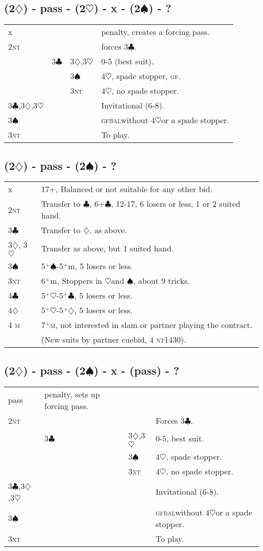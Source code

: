 \documentclass{article}
\newcommand{\bal}{\textsc{bal}}
\newcommand{\gf}{\textsc{gf}}
\renewcommand{\c}{\ensuremath{\clubsuit}}
\renewcommand{\d}{\ensuremath{\diamondsuit}}
\newcommand{\h}{\ensuremath{\heartsuit}}
\newcommand{\s}{\ensuremath{\spadesuit}}
\newcommand{\nt}{\textsc{nt}}
\newcommand{\+}{\ensuremath{^+}}
\newcommand{\M}{\textsc{m}}
\begin{document}
\subsection{(2\d) - pass - (2\h) - x - (2\s) - ?}
\begin{tabular}{llll}
x &&& penalty, creates a forcing pass.\\
2\nt &&& forces 3\c.\\
& 3\c & 3\d,3\h & 0-5 (best suit).\\
&& 3\s & 4\h, spade stopper, \gf.\\
&& 3\nt & 4\h, no spade stopper.\\
3\c,3\d,3\h &&& Invitational (6-8).\\
3\s &&& \gf \bal without 4\h or a spade stopper.\\
3\nt &&& To play.\\
\end{tabular}

\subsection{(2\d) - pass - (2\s) - ?}
\begin{tabular}{ll}
x  & 17+, Balanced or not suitable for any other bid. \\
2\nt& Transfer to \c, 6+\c, 12-17, 6 losers or less, 1 or 2 suited hand. \\
3\c & Transfer to \d, as above.\\
3\d, 3\h & Transfer as above, but 1 suited hand.\\
3\s & 5\+\s-5\+m, 5 losers or less.\\
3\nt& 6\+m, Stoppers in \h and \s, about 9 tricks.\\
4\c & 5\+\h-5\+\c, 5 losers or less.\\
4\d & 5\+\h-5\+\d, 5 losers or less.\\
4 \M& 7\+\M, not interested in slam or partner playing the contract. \\
&(New suits by partner cuebid, 4 \nt 1430).\\
\end{tabular}

\subsection{(2\d) - pass - (2\s) - x - (pass) - ?}
\begin{tabular}{llll}
pass & penalty, sets up forcing pass.\\
2\nt &&& Forces 3\c. \\
& 3\c & 3\d,3\h & 0-5, best suit. \\
&& 3\s & 4\h, spade stopper. \\
&& 3\nt & 4\h, no spade stopper.\\
3\c,3\d,3\h &&& Invitational (6-8).\\
3\s &&& \gf \bal without 4\h or a spade stopper.\\
3\nt &&& To play.\\
\end{tabular}
\end{document}
